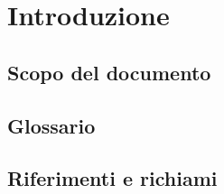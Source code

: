 \chapter{Introduzione}
\section{Scopo del documento}
\section{Glossario}
\section{Riferimenti e richiami}